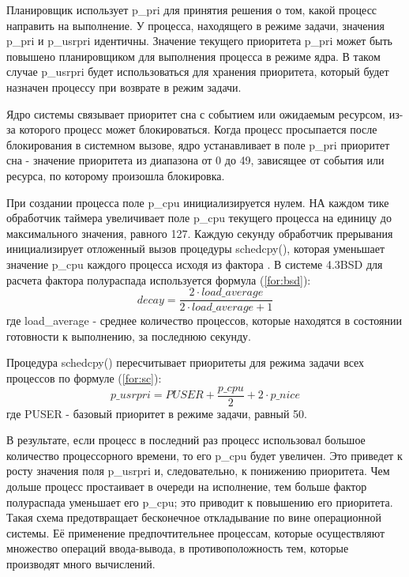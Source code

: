 Планировщик использует p\_pri для принятия решения о том, какой процесс направить на выполнение. У процесса, находящего в режиме задачи, значения p\_pri и p\_usrpri идентичны. Значение текущего приоритета p\_pri может быть повышено планировщиком для выполнения процесса в режиме ядра. В таком случае p\_usrpri будет использоваться для хранения приоритета, который будет назначен процессу при возврате в режим задачи. 

Ядро системы связывает приоритет сна с событием или ожидаемым ресурсом, из-за которого процесс может блокироваться. Когда процесс просыпается после блокирования в системном вызове, ядро устанавливает в поле p\_pri приоритет сна - значение приоритета из диапазона от 0 до 49, зависящее от события или ресурса, по которому произошла блокировка.

При создании процесса поле p\_cpu инициализируется нулем. НА каждом тике обработчик таймера увеличивает поле p\_cpu текущего процесса на единицу до максимального значения, равного 127. Каждую секунду обработчик прерывания инициализирует отложенный вызов процедуры schedcpy(), которая уменьшает значение p\_cpu каждого процесса исходя из фактора \grqq. В системе 4.3BSD для расчета фактора полураспада используется формула (\ref{for:bsd}):
\begin{equation}
	\label{for:bsd}
	decay = \frac{2 \cdot load\_average}{2 \cdot load\_average + 1}
\end{equation}
где load\_average - среднее количество процессов, которые находятся в состоянии готовности к выполнению, за последнюю секунду.

Процедура schedcpy() пересчитывает приоритеты для режима задачи всех процессов по формуле (\ref{for:sc}):
\begin{equation}
	\label{for:sc}
	p\_usrpri = PUSER + \frac{p\_cpu}{2} + 2 \cdot p\_nice
\end{equation}
где PUSER - базовый приоритет в режиме задачи, равный 50. 

В результате, если процесс в последний раз процесс использовал большое количество процессорного времени, то его p\_cpu будет увеличен. Это приведет к росту значения поля p\_usrpri и, следовательно, к понижению приоритета. Чем дольше процесс простаивает в очереди на исполнение, тем больше фактор полураспада уменьшает его p\_cpu; это приводит к повышению его приоритета. Такая схема предотвращает бесконечное откладывание по вине операционной системы. Её применение предпочтительнее процессам, которые осуществляют множество операций ввода-вывода, в противоположность тем, которые производят много вычислений.